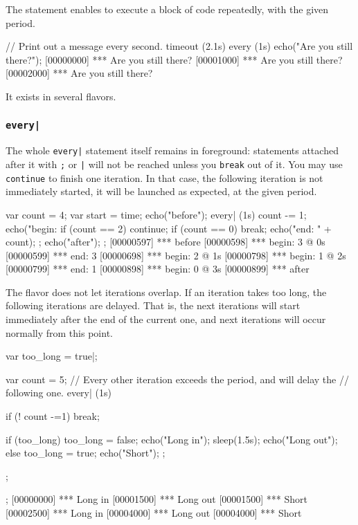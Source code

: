 The  statement enables to execute a block of code
repeatedly, with the given period.

\begin{urbiscript}
// Print out a message every second.
timeout (2.1s)
  every (1s)
    echo("Are you still there?");
[00000000] *** Are you still there?
[00001000] *** Are you still there?
[00002000] *** Are you still there?
\end{urbiscript}

It exists in several flavors.

\subsubsection{\lstinline'every|'}
The whole \lstinline'every|' statement itself remains in foreground:
statements attached after it with \lstinline';' or \lstinline'|' will
not be reached unless you \lstinline'break' out of it.  You may use
\lstinline|continue| to finish one iteration.  In that case, the
following iteration is not immediately started, it will be launched as
expected, at the given period.

\begin{urbiscript}
{
  var count = 4;
  var start = time;
  echo("before");
  every| (1s)
  {
    count -= 1;
    echo("begin: %
    if (count == 2)
      continue;
    if (count == 0)
      break;
    echo("end:   " + count);
  };
  echo("after");
};
[00000597] *** before
[00000598] *** begin: 3 @ 0s
[00000599] *** end:   3
[00000698] *** begin: 2 @ 1s
[00000798] *** begin: 1 @ 2s
[00000799] *** end:   1
[00000898] *** begin: 0 @ 3s
[00000899] *** after
\end{urbiscript}

The  flavor does not let iterations overlap. If an
iteration takes too long, the following iterations are delayed. That
is, the next iterations will start immediately after the end of the
current one, and next iterations will occur normally from this point.

\begin{urbiscript}
{
  var too_long = true|;

  var count = 5;
  // Every other iteration exceeds the period, and will delay the
  // following one.
  every| (1s)
  {
    if (! count -=1)
      break;

    if (too_long)
    {
      too_long = false;
      echo("Long in");
      sleep(1.5s);
      echo("Long out");
    }
    else
    {
      too_long = true;
      echo("Short");
    };
  };
};
[00000000] *** Long in
[00001500] *** Long out
[00001500] *** Short
[00002500] *** Long in
[00004000] *** Long out
[00004000] *** Short
\end{urbiscript}

